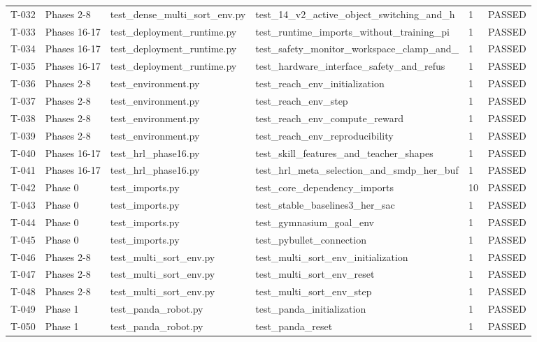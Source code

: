 \documentclass[11pt,a4paper,oneside]{book}
\begin{document}
\begin{longtable}{l l l l l l}
T-032 & Phases 2-8 & test\_dense\_multi\_sort\_env.py & test\_14\_v2\_active\_object\_switching\_and\_h & 1 & PASSED \\
T-033 & Phases 16-17 & test\_deployment\_runtime.py & test\_runtime\_imports\_without\_training\_pi & 1 & PASSED \\
T-034 & Phases 16-17 & test\_deployment\_runtime.py & test\_safety\_monitor\_workspace\_clamp\_and\_ & 1 & PASSED \\
T-035 & Phases 16-17 & test\_deployment\_runtime.py & test\_hardware\_interface\_safety\_and\_refus & 1 & PASSED \\
T-036 & Phases 2-8 & test\_environment.py & test\_reach\_env\_initialization & 1 & PASSED \\
T-037 & Phases 2-8 & test\_environment.py & test\_reach\_env\_step & 1 & PASSED \\
T-038 & Phases 2-8 & test\_environment.py & test\_reach\_env\_compute\_reward & 1 & PASSED \\
T-039 & Phases 2-8 & test\_environment.py & test\_reach\_env\_reproducibility & 1 & PASSED \\
T-040 & Phases 16-17 & test\_hrl\_phase16.py & test\_skill\_features\_and\_teacher\_shapes & 1 & PASSED \\
T-041 & Phases 16-17 & test\_hrl\_phase16.py & test\_hrl\_meta\_selection\_and\_smdp\_her\_buf & 1 & PASSED \\
T-042 & Phase 0 & test\_imports.py & test\_core\_dependency\_imports & 10 & PASSED \\
T-043 & Phase 0 & test\_imports.py & test\_stable\_baselines3\_her\_sac & 1 & PASSED \\
T-044 & Phase 0 & test\_imports.py & test\_gymnasium\_goal\_env & 1 & PASSED \\
T-045 & Phase 0 & test\_imports.py & test\_pybullet\_connection & 1 & PASSED \\
T-046 & Phases 2-8 & test\_multi\_sort\_env.py & test\_multi\_sort\_env\_initialization & 1 & PASSED \\
T-047 & Phases 2-8 & test\_multi\_sort\_env.py & test\_multi\_sort\_env\_reset & 1 & PASSED \\
T-048 & Phases 2-8 & test\_multi\_sort\_env.py & test\_multi\_sort\_env\_step & 1 & PASSED \\
T-049 & Phase 1 & test\_panda\_robot.py & test\_panda\_initialization & 1 & PASSED \\
T-050 & Phase 1 & test\_panda\_robot.py & test\_panda\_reset & 1 & PASSED \\

\end{longtable}
\end{document}
